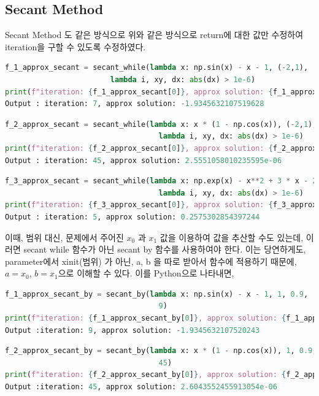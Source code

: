 \documentclass[11pt]{article}
\begin{document}
\subsection{Secant Method} 
\noindent 
Secant Method 도 같은 방식으로 위와 같은 방식으로 return에 대한 값만 수정하여 iteration을 구할 수 있도록 수정하였다.  

\begin{lstlisting}[language=Python]
f_1_approx_secant = secant_while(lambda x: np.sin(x) - x - 1, (-2,1), 
                   		lambda i, xy, dx: abs(dx) > 1e-6)
print(f"iteration: {f_1_approx_secant[0]}, approx solution: {f_1_approx_secant[1]}")
Output : iteration: 7, approx solution: -1.9345632107519628
\end{lstlisting}

\begin{lstlisting}[language=Python]
f_2_approx_secant = secant_while(lambda x: x * (1 - np.cos(x)), (-2,1), 
                                   lambda i, xy, dx: abs(dx) > 1e-6)
print(f"iteration: {f_2_approx_secant[0]}, approx solution: {f_2_approx_secant[1]}")
Output : iteration: 45, approx solution: 2.5551058010235595e-06
\end{lstlisting}

\begin{lstlisting}[language=Python]
f_3_approx_secant = secant_while(lambda x: np.exp(x) - x**2 + 3 * x - 2, (-2,1), 
                                   lambda i, xy, dx: abs(dx) > 1e-6)
print(f"iteration: {f_3_approx_secant[0]}, approx solution: {f_3_approx_secant[1]}")
Output : iteration: 5, approx solution: 0.2575302854397244
\end{lstlisting}

\noindent 
이때, 범위 대신, 문제에서 주어진 $x_0$ 과 $x_1$ 값을 이용하여 값을 추산할 수도 있는데, 이러면 secant while 함수가 아닌 secant by 함수를 사용하여야 한다. 이는 당연하게도, parameter에서 xinit(범위) 가 아닌, a, b 을 따로 받아서 함수에 적용하기 때문에, $ a = x_0 $, $b = x_1 $으로 이해할 수 있다. 이를 Python으로 나타내면, 

\begin{lstlisting}[language=Python]
f_1_approx_secant_by = secant_by(lambda x: np.sin(x) - x - 1, 1, 0.9,
                                   9)
print(f"iteration: {f_1_approx_secant_by[0]}, approx solution: {f_1_approx_secant_by[1]}")
Output :iteration: 9, approx solution: -1.9345632107520243
\end{lstlisting}

\begin{lstlisting}[language=Python]
f_2_approx_secant_by = secant_by(lambda x: x * (1 - np.cos(x)), 1, 0.9,
                                   45)
print(f"iteration: {f_2_approx_secant_by[0]}, approx solution: {f_2_approx_secant_by[1]}")
Output :iteration: 45, approx solution: 2.6043552455913054e-06
\end{lstlisting}
\end{document}
